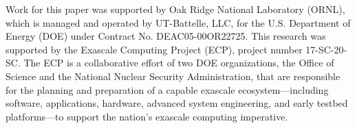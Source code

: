 \documentclass{webofc}
\begin{document}
Work for this paper was supported by Oak Ridge National Laboratory (ORNL), which is managed and operated by UT-Battelle, LLC, for the U.S. Department of Energy (DOE) under Contract No. DEAC05-00OR22725.
This research was supported by the Exascale Computing
Project (ECP), project number 17-SC-20-SC. The ECP is a collaborative effort of
two DOE organizations, the Office of Science and the National Nuclear Security
Administration, that are responsible for the planning and preparation of a
capable exascale ecosystem---including software, applications, hardware,
advanced system engineering, and early testbed platforms---to support the
nation's exascale computing imperative.


\end{document}
